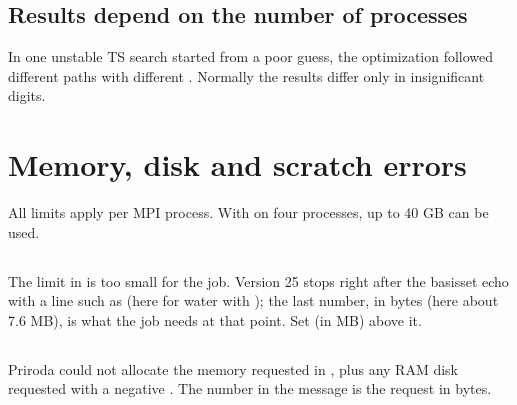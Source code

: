 \documentclass[letterpaper,10pt,english,openany,oneside]{sphinxmanual}
\begin{document}
\subsection{Results depend on the number of processes}
\label{\detokenize{troubleshooting/common-problems:results-depend-on-the-number-of-processes}}
\sphinxAtStartPar
In one unstable TS search started from a poor guess, the optimization followed different paths with different
. Normally the results differ only in insignificant digits.




\section{Memory, disk and scratch errors}
\label{\detokenize{troubleshooting/common-problems:memory-disk-and-scratch-errors}}\label{\detokenize{troubleshooting/common-problems:troubleshooting-memory}}
\sphinxAtStartPar
All {\hyperref[\detokenize{reference/system:group-system}]{}} limits apply per MPI process. With  on four processes, up to 40 GB can be
used. 


\subsection{}
\label{\detokenize{troubleshooting/common-problems:need-bytes}}
\sphinxAtStartPar
{} The {\hyperref[\detokenize{reference/system:system-memory}]{}} limit in  is too small for the job. Version 25 stops right after
the basis\sphinxhyphen{}set echo with a line such as  (here for water with ); the
last number, in bytes (here about 7.6 MB), is what the job needs at that point. Set  (in MB) above it.




\subsection{}
\label{\detokenize{troubleshooting/common-problems:malloc-failed}}
\sphinxAtStartPar
{} Priroda could not allocate the memory requested in {\hyperref[\detokenize{reference/system:system-memory}]{}}, plus any RAM disk
requested with a negative {\hyperref[\detokenize{reference/system:system-disk}]{}}. The number in the message is the request in bytes.
\end{document}
